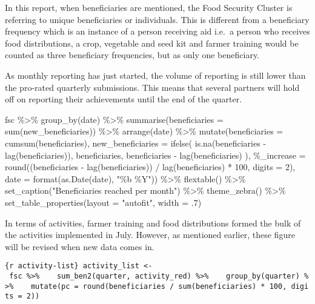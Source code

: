 \documentclass[
]{article}
\newenvironment{Shaded}{\begin{snugshade}}{\end{snugshade}}
\newcommand{\NormalTok}[1]{#1}
\begin{document}
In this report, when beneficiaries are mentioned, the Food Security
Cluster is referring to unique beneficiaries or individuals. This is
different from a beneficiary frequency which is an instance of a person
receiving aid i.e.~a person who receives food distributions, a crop,
vegetable and seed kit and farmer training would be counted as three
beneficiary frequencies, but as only one beneficiary.

As monthly reporting has just started, the volume of reporting is still
lower than the pro-rated quarterly submissions. This means that several
partners will hold off on reporting their achievements until the end of
the quarter.

\begin{Shaded}
\begin{Highlighting}[]
\NormalTok{fsc \%\textgreater{}\%   }
\NormalTok{  group\_by(date) \%\textgreater{}\% }
\NormalTok{  summarise(beneficiaries = sum(new\_beneficiaries)) \%\textgreater{}\% }
\NormalTok{  arrange(date) \%\textgreater{}\% }
\NormalTok{  mutate(beneficiaries = cumsum(beneficiaries), }
\NormalTok{         new\_beneficiaries = ifelse(}
\NormalTok{           is.na(beneficiaries {-} lag(beneficiaries)), }
\NormalTok{           beneficiaries, }
\NormalTok{           beneficiaries {-} lag(beneficiaries)}
\NormalTok{         ), }
\NormalTok{         \textasciigrave{}\%\_increase\textasciigrave{} = round((beneficiaries {-} lag(beneficiaries)) / }
\NormalTok{                            lag(beneficiaries) * 100, }
\NormalTok{                          digits = 2), }
\NormalTok{         date = format(as.Date(date), "\%b \%Y")) \%\textgreater{}\% }
\NormalTok{  flextable() \%\textgreater{}\% }
\NormalTok{  set\_caption("Beneficiaries reached per month") \%\textgreater{}\% }
\NormalTok{  theme\_zebra() \%\textgreater{}\% }
\NormalTok{  set\_table\_properties(layout = "autofit", width = .7) }
\end{Highlighting}
\end{Shaded}

In terms of activities, farmer training and food distributions formed
the bulk of the activities implemented in July. However, as mentioned
earlier, these figure will be revised when new data comes in.

\texttt{\{r\ activity-list\}\ activity\_list\ \textless{}-\ fsc\ \%\textgreater{}\%\ \ \ \ sum\_ben2(quarter,\ activity\_red)\ \%\textgreater{}\%\ \ \ \ group\_by(quarter)\ \%\textgreater{}\%\ \ \ \ mutate(pc\ =\ round(beneficiaries\ /\ sum(beneficiaries)\ *\ 100,\ digits\ =\ 2))}
\end{document}
